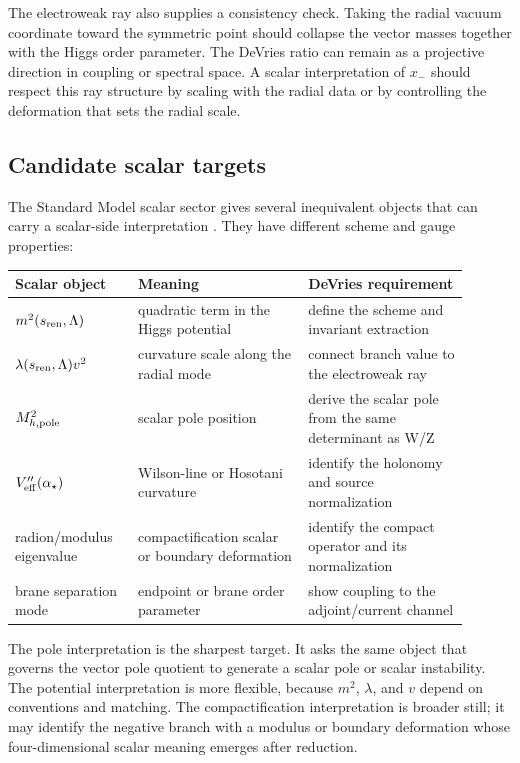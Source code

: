 The electroweak ray also supplies a consistency check.  Taking the radial vacuum coordinate toward the symmetric point should collapse the vector masses together with the Higgs order parameter.  The DeVries ratio can remain as a projective direction in coupling or spectral space.  A scalar interpretation of \(x_-\) should respect this ray structure by scaling with the radial data or by controlling the deformation that sets the radial scale.

\subsection{Candidate scalar targets}

The Standard Model scalar sector gives several inequivalent objects that can carry a scalar-side interpretation \cite{Logan2022,Dawson2018}.  They have different scheme and gauge properties:
\begin{center}
\footnotesize
\begin{tabular}{p{0.24\linewidth}p{0.34\linewidth}p{0.32\linewidth}}
\toprule
Scalar object & Meaning & DeVries requirement\\
\midrule
\(m^2(s_{\rm ren},\Lambda)\) & quadratic term in the Higgs potential & define the scheme and invariant extraction\\
\(\lambda(s_{\rm ren},\Lambda)v^2\) & curvature scale along the radial mode & connect branch value to the electroweak ray\\
\(M_{h,\rm pole}^2\) & scalar pole position & derive the scalar pole from the same determinant as W/Z\\
\(V''_{\rm eff}(\alpha_\star)\) & Wilson-line or Hosotani curvature & identify the holonomy and source normalization\\
radion/modulus eigenvalue & compactification scalar or boundary deformation & identify the compact operator and its normalization\\
brane separation mode & endpoint or brane order parameter & show coupling to the adjoint/current channel\\
\bottomrule
\end{tabular}
\end{center}

The pole interpretation is the sharpest target.  It asks the same object that governs the vector pole quotient to generate a scalar pole or scalar instability.  The potential interpretation is more flexible, because \(m^2\), \(\lambda\), and \(v\) depend on conventions and matching.  The compactification interpretation is broader still; it may identify the negative branch with a modulus or boundary deformation whose four-dimensional scalar meaning emerges after reduction.

